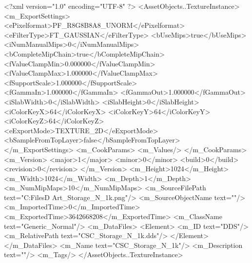 <?xml version="1.0" encoding="UTF-8" ?>
<AssetObjects..TextureInstance>
	<m_ExportSettings>
		<ePixelformat>PF_R8G8B8A8_UNORM</ePixelformat>
		<eFilterType>FT_GAUSSIAN</eFilterType>
		<bUseMips>true</bUseMips>
		<iNumManualMips>0</iNumManualMips>
		<bCompleteMipChain>true</bCompleteMipChain>
		<fValueClampMin>0.000000</fValueClampMin>
		<fValueClampMax>1.000000</fValueClampMax>
		<fSupportScale>1.000000</fSupportScale>
		<fGammaIn>1.000000</fGammaIn>
		<fGammaOut>1.000000</fGammaOut>
		<iSlabWidth>0</iSlabWidth>
		<iSlabHeight>0</iSlabHeight>
		<iColorKeyX>64</iColorKeyX>
		<iColorKeyY>64</iColorKeyY>
		<iColorKeyZ>64</iColorKeyZ>
		<eExportMode>TEXTURE_2D</eExportMode>
		<bSampleFromTopLayer>false</bSampleFromTopLayer>
	</m_ExportSettings>
	<m_CookParams>
		<m_Values/>
	</m_CookParams>
	<m_Version>
		<major>1</major>
		<minor>0</minor>
		<build>0</build>
		<revision>0</revision>
	</m_Version>
	<m_Height>1024</m_Height>
	<m_Width>1024</m_Width>
	<m_Depth>1</m_Depth>
	<m_NumMipMaps>10</m_NumMipMaps>
	<m_SourceFilePath text="C:\Users\Shadow\Desktop\Working Files\3D Art\Textures\CSC_Storage_N_1k.png"/>
	<m_SourceObjectName text=""/>
	<m_ImportedTime>0</m_ImportedTime>
	<m_ExportedTime>3642668208</m_ExportedTime>
	<m_ClassName text="Generic_Normal"/>
	<m_DataFiles>
		<Element>
			<m_ID text="DDS"/>
			<m_RelativePath text="CSC_Storage_N_1k.dds"/>
		</Element>
	</m_DataFiles>
	<m_Name text="CSC_Storage_N_1k"/>
	<m_Description text=""/>
	<m_Tags/>
</AssetObjects..TextureInstance>

